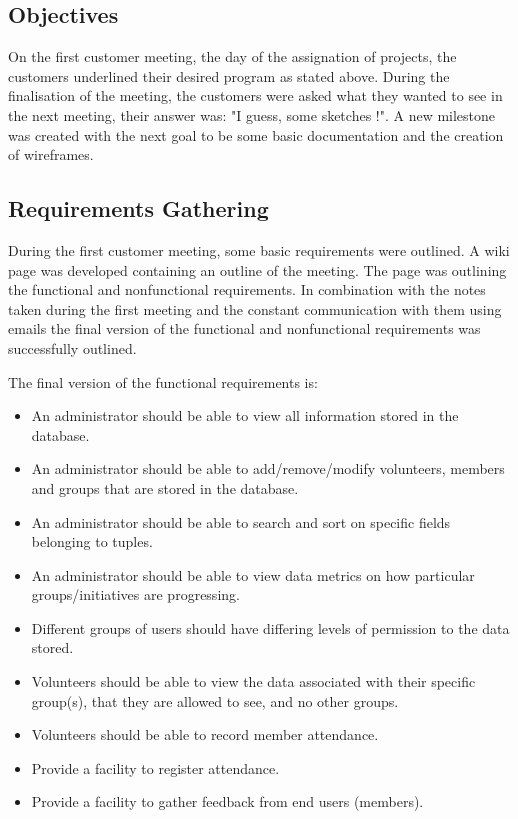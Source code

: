\documentclass{l3proj}
\begin{document}
\subsection{Objectives}
\label{objectives}

On the first customer meeting, the day of the assignation of projects, the customers underlined their desired program as stated above. During the finalisation of the meeting, the customers were asked what they wanted to see in the next meeting, their answer was: "I guess, some sketches !". A new milestone was created with the next goal to be some basic documentation and the creation of wireframes.

\subsection{Requirements Gathering}
\label{requirements}

During the first customer meeting, some basic requirements were outlined. A wiki page was developed containing an outline of the meeting. The page was outlining the functional and nonfunctional requirements. In combination with the notes taken during the first meeting and the constant communication with them using emails the final version of the functional and nonfunctional requirements was successfully outlined.

The final version of the functional requirements is:
\begin{itemize}

\item An administrator should be able to view all information stored in the database.

\item An administrator should be able to add/remove/modify volunteers, members and groups that are stored in the database.

\item An administrator should be able to search and sort on specific fields belonging to tuples.

\item An administrator should be able to view data metrics on how particular groups/initiatives are progressing.

\item Different groups of users should have differing levels of permission to the data stored.

\item Volunteers should be able to view the data associated with their specific group(s), that they are allowed to see, and no other groups.

\item Volunteers should be able to record member attendance.

\item Provide a facility to register attendance.

\item Provide a facility to gather feedback from end users (members).

\end{itemize}
\end{document}
